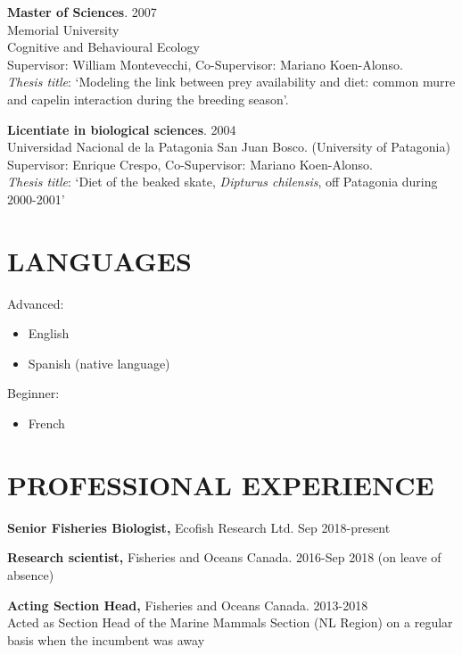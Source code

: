 \documentclass{res}
\begin{document}
\begin{resume}
\textbf{Master of Sciences}. 2007 \\
Memorial University \\
Cognitive and Behavioural Ecology \\
Supervisor: William Montevecchi, Co-Supervisor: Mariano Koen-Alonso.\\
\textit{Thesis title}: ‘Modeling the link between prey availability and diet: common murre and capelin interaction during the breeding season’.

\textbf{Licentiate in biological sciences}. 2004\\
Universidad Nacional de la Patagonia San Juan Bosco.
(University of Patagonia) \\
Supervisor: Enrique Crespo, Co-Supervisor: Mariano Koen-Alonso.\\
\textit{Thesis title}: ‘Diet of the beaked skate, \textit{Dipturus chilensis}, off Patagonia during 2000-2001’


\section{LANGUAGES}
Advanced:
\begin{itemize}
	\item[] English
	\item[] Spanish (native language)
\end{itemize}
Beginner:
\begin{itemize}
	\item[] French
\end{itemize}
 
 

\section{PROFESSIONAL EXPERIENCE}
\vspace{0.1in}
\textbf{Senior Fisheries Biologist,} Ecofish Research Ltd. Sep 2018-present
	
\textbf{Research scientist,} Fisheries and Oceans Canada. 2016-Sep 2018 (on leave of absence)

\textbf{Acting Section Head,} Fisheries and Oceans Canada. 2013-2018\\
Acted as Section Head of the Marine Mammals Section (NL Region) on a regular basis when the incumbent was away


\end{resume}
\end{document}
